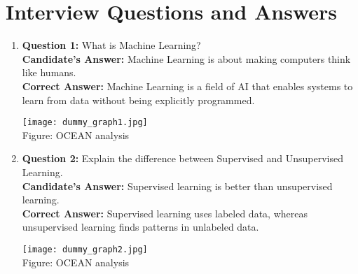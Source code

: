 \documentclass[a4paper,12pt]{article}
\begin{document}
\section*{Interview Questions and Answers}
\begin{enumerate}
    \item 
    \begin{minipage}{0.7\textwidth}
        \textbf{Question 1:} What is Machine Learning? \\
        \textbf{Candidate's Answer:} Machine Learning is about making computers think like humans. \\
        \textbf{Correct Answer:} Machine Learning is a field of AI that enables systems to learn from data without being explicitly programmed.
    \end{minipage}
    \hfill
    \begin{minipage}{0.28\textwidth}
        \begin{flushright}
            \texttt{[image: dummy\_graph1.jpg]} \\
            \small Figure: OCEAN analysis
        \end{flushright}
    \end{minipage}

    \item 
    \begin{minipage}{0.7\textwidth}
        \textbf{Question 2:} Explain the difference between Supervised and Unsupervised Learning. \\
        \textbf{Candidate's Answer:} Supervised learning is better than unsupervised learning. \\
        \textbf{Correct Answer:} Supervised learning uses labeled data, whereas unsupervised learning finds patterns in unlabeled data.
    \end{minipage}
    \hfill
    \begin{minipage}{0.28\textwidth}
        \begin{flushright}
            \texttt{[image: dummy\_graph2.jpg]} \\
            \small Figure: OCEAN analysis
        \end{flushright}
    \end{minipage}


\end{enumerate}
\end{document}
